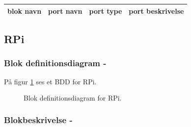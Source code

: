 \documentclass[Arkitektur/System_main.tex]{subfiles}
\begin{document}
\begin{table}[]
\begin{tabular}{|l|l|l|l|}
\hline
blok navn & port navn & port type & port beskrivelse \\ \hline
\end{tabular}
\end{table}




\subsection{RPi} \label{sec:rpi_hardware}
\subsubsection{Blok definitionsdiagram - } \label{sec:rpi_hardware_bdd}

På figur \ref{fig:rpi_hardware_bdd} ses et BDD for RPi.

\begin{figure}[H]
    \centering
    \caption{Blok definitionsdiagram for RPi.}
    \label{fig:rpi_hardware_bdd}
\end{figure}

\subsubsection{Blokbeskrivelse - } \label{sec:rpi_hardware_block_description}
\end{document}

